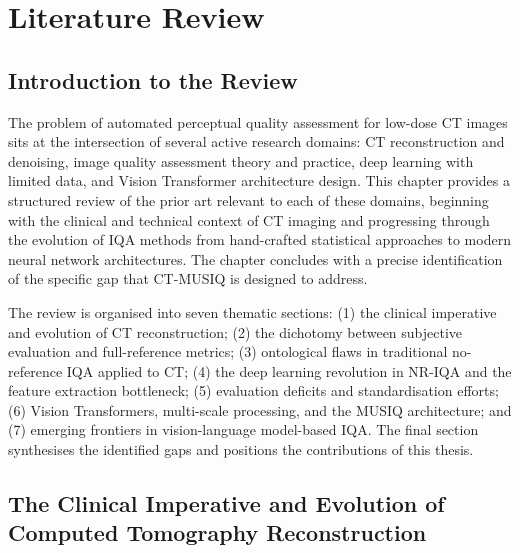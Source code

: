 
\chapter{Literature Review}
\label{chap:literature_review}

\section{Introduction to the Review}
\label{sec:lit_intro}

The problem of automated perceptual quality assessment for low-dose CT images sits at the
intersection of several active research domains: CT reconstruction and denoising, image
quality assessment theory and practice, deep learning with limited data, and Vision
Transformer architecture design. This chapter provides a structured review of the prior
art relevant to each of these domains, beginning with the clinical and technical context
of CT imaging and progressing through the evolution of IQA methods from hand-crafted
statistical approaches to modern neural network architectures. The chapter concludes with
a precise identification of the specific gap that CT-MUSIQ is designed to address.

The review is organised into seven thematic sections: (1) the clinical imperative and
evolution of CT reconstruction; (2) the dichotomy between subjective evaluation and
full-reference metrics; (3) ontological flaws in traditional no-reference IQA applied to
CT; (4) the deep learning revolution in NR-IQA and the feature extraction bottleneck;
(5) evaluation deficits and standardisation efforts; (6) Vision Transformers, multi-scale
processing, and the MUSIQ architecture; and (7) emerging frontiers in vision-language
model-based IQA. The final section synthesises the identified gaps and positions the
contributions of this thesis.


\section{The Clinical Imperative and Evolution of Computed Tomography Reconstruction}
\label{sec:lit_ct_reconstruction}

